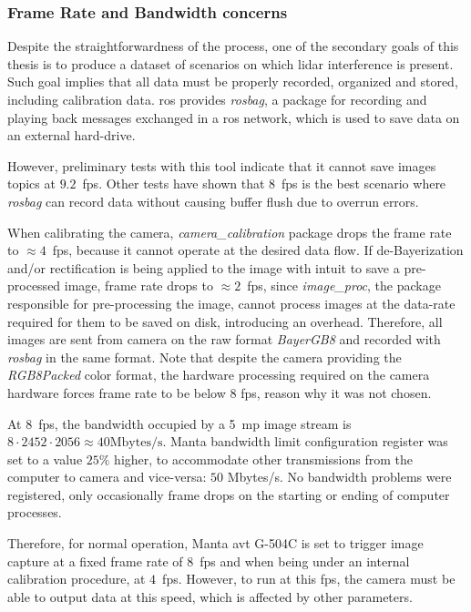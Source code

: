 \subsubsection{Frame Rate and Bandwidth concerns}
Despite the straightforwardness of the process, one of the secondary goals of this thesis is to produce a dataset of scenarios on which \ac{lidar} interference is present. Such goal implies that all data must be properly recorded, organized and stored, including calibration data. \ac{ros} provides \emph{rosbag}, a package for recording and playing back messages exchanged in a \ac{ros} network, which is used to save data on an external hard-drive.

However, preliminary tests with this tool indicate that it cannot save images topics at $9.2$~\ac{fps}. Other tests have shown that $8$~\ac{fps} is the best scenario where \emph{rosbag} can record data without causing buffer flush due to overrun errors. 

When calibrating the camera, \emph{camera\_calibration} package drops the frame rate to $\approx 4$~\ac{fps}, because it cannot operate at the desired data flow. If de-Bayerization and/or rectification is being applied to the image with intuit to save a pre-processed image, frame rate drops to $\approx 2$~\ac{fps}, since \emph{image\_proc}, the package responsible for pre-processing the image, cannot process images at the data-rate required for them to be saved on disk, introducing an overhead. Therefore, all images are sent from camera on the raw format \emph{BayerGB8} and recorded with \emph{rosbag} in the same format. Note that despite the camera providing  the \emph{RGB8Packed} color format, the hardware processing required on the camera hardware forces frame rate to be below $8$ \ac{fps}, reason why it was not chosen.

At 8~\ac{fps}, the bandwidth occupied by a 5~\ac{mp} image stream is $8 \cdot 2452 \cdot 2056 \approx 40 \text{Mbytes/s}$. Manta bandwidth limit configuration register was set to a value $25\%$ higher, to accommodate other transmissions from the computer to camera and vice-versa: $50$ Mbytes/s. No bandwidth problems were registered, only occasionally frame drops on the starting or ending of computer processes.

Therefore, for normal operation, Manta \ac{avt} G-504C is set to trigger image capture at a fixed frame rate of $8$~\ac{fps} and when being under an internal calibration procedure, at $4$~\ac{fps}. However, to run at this \ac{fps}, the camera must be able to output data at this speed, which is affected by other parameters.

